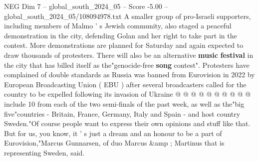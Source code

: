 \begin{textsample}{NEG Dim 7 – global\_south\_2024\_05 – Score -5.00 – global\_south\_2024\_05/108094978.txt}
A smaller group of pro-Israeli supporters, including members of Malmo ' s Jewish community, also staged a peaceful demonstration in the city, defending Golan and her right to take part in the contest.
More demonstrations are planned for Saturday and again expected to draw thousands of protesters.
There will also be an alternative \textbf{music} \textbf{festival} in the city that has billed itself as the"genocide-free \textbf{song} contest".
Protesters have complained of double standards as Russia was banned from Eurovision in 2022 by European Broadcasting Union ( EBU ) after several broadcasters called for the country to be expelled following its invasion of Ukraine @ @ @ @ @ @ @ @ @ @ include 10 from each of the two semi-finals of the past week, as well as the"big five"countries - Britain, France, Germany, Italy and Spain - and host country Sweden."Of course people want to express their own opinions and stuff like that.
But for us, you know, it ' s just a dream and an honour to be a part of Eurovision,"Marcus Gunnarsen, of duo Marcus \&amp ; Martinus that is representing Sweden, said.

\end{textsample}
